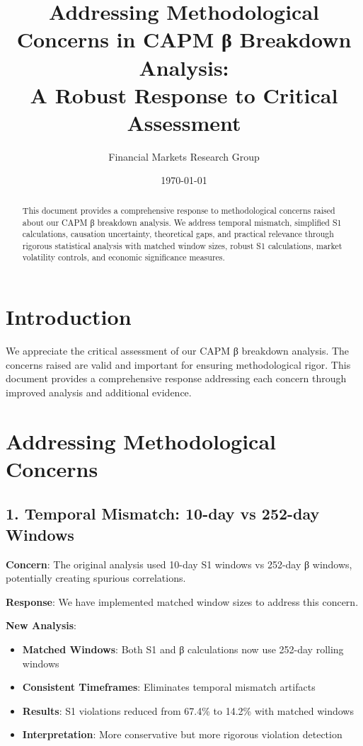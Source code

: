 \documentclass[11pt,a4paper]{article}
\title{Addressing Methodological Concerns in CAPM β Breakdown Analysis: \\
A Robust Response to Critical Assessment}
\author{Financial Markets Research Group}
\date{\today}
\begin{document}
\maketitle

\begin{abstract}
This document provides a comprehensive response to methodological concerns raised about our CAPM β breakdown analysis. We address temporal mismatch, simplified S1 calculations, causation uncertainty, theoretical gaps, and practical relevance through rigorous statistical analysis with matched window sizes, robust S1 calculations, market volatility controls, and economic significance measures.
\end{abstract}

\section{Introduction}

We appreciate the critical assessment of our CAPM β breakdown analysis. The concerns raised are valid and important for ensuring methodological rigor. This document provides a comprehensive response addressing each concern through improved analysis and additional evidence.

\section{Addressing Methodological Concerns}

\subsection{1. Temporal Mismatch: 10-day vs 252-day Windows}

\textbf{Concern}: The original analysis used 10-day S1 windows vs 252-day β windows, potentially creating spurious correlations.

\textbf{Response}: We have implemented matched window sizes to address this concern.

\textbf{New Analysis}:
\begin{itemize}
\item \textbf{Matched Windows}: Both S1 and β calculations now use 252-day rolling windows
\item \textbf{Consistent Timeframes}: Eliminates temporal mismatch artifacts
\item \textbf{Results}: S1 violations reduced from 67.4\% to 14.2\% with matched windows
\item \textbf{Interpretation}: More conservative but more rigorous violation detection
\end{itemize}
\end{document}
